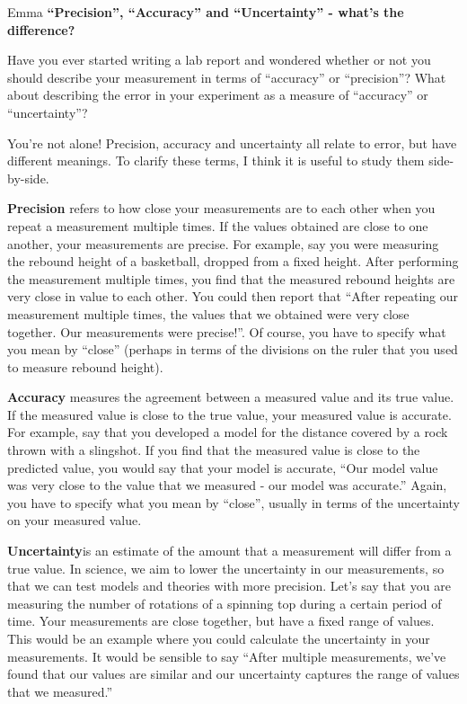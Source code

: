 \begin{studentOpinion}{Emma}
\textbf{``Precision'', ``Accuracy'' and ``Uncertainty'' - what's the difference?}

Have you ever started writing a lab report and wondered whether or not you should describe your measurement in terms of ``accuracy'' or ``precision''? What about describing the error in your experiment as a measure of ``accuracy'' or ``uncertainty''? 

You're not alone! Precision, accuracy and uncertainty all relate to error, but have different meanings. To clarify these terms, I think it is useful to study them side-by-side.

\textbf{Precision} refers to how close your measurements are to each other when you repeat a measurement multiple times. If the values obtained are close to one another, your measurements are precise. For example, say you were measuring the rebound height of a basketball, dropped from a fixed height. After performing the measurement multiple times, you find that the measured rebound heights are very close in value to each other. You could then report that ``After repeating our measurement multiple times, the values that we obtained were very close together. Our measurements were precise!''. Of course, you have to specify what you mean by ``close'' (perhaps in terms of the divisions on the ruler that you used to measure rebound height).

\textbf{Accuracy} measures the agreement between a measured value and its true value. If the measured value is close to the true value, your measured value is accurate. For example, say that you developed a model for the distance covered by a rock thrown with a slingshot. If you find that the measured value is close to the predicted value, you would say that your model is accurate, ``Our model value was very close to the value that we measured - our model was accurate.'' Again, you have to specify what you mean by ``close'', usually in terms of the uncertainty on your measured value.

\textbf{Uncertainty}is an estimate of the amount that a measurement will differ from a true value. In science, we aim to lower the uncertainty in our measurements, so that we can test models and theories with more precision. Let's say that you are measuring the number of rotations of a spinning top during a certain period of time. Your measurements are close together, but have a fixed range of values. This would be an example where you could calculate the uncertainty in your measurements. It would be sensible to say ``After multiple measurements, we've found that our values are similar and our uncertainty captures the range of values that we measured.''

\end{studentOpinion}


